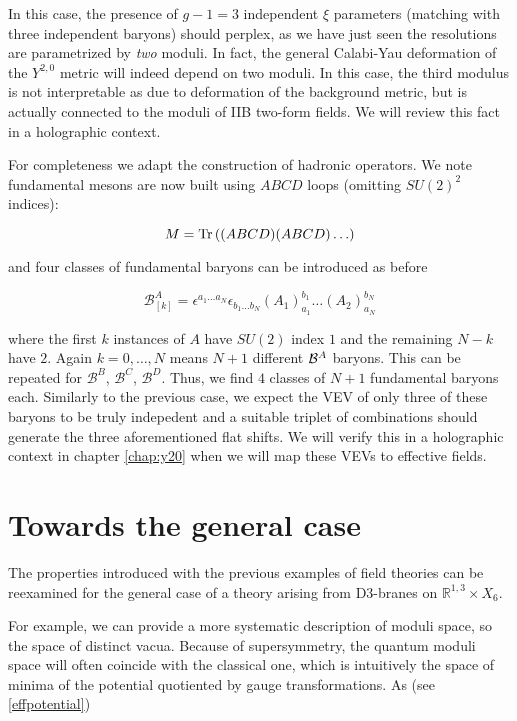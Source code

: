 In this case, the presence of $g-1 = 3$ independent $\xi$ parameters (matching with three independent baryons) should perplex, as we have just seen the resolutions are parametrized by \emph{two} moduli. In fact, the general Calabi-Yau deformation of the $Y^{2,0}$ metric will indeed depend on two moduli. In this case, the third modulus is not interpretable as due to deformation of the background metric, but is actually connected to the moduli of IIB two-form fields. We will review this fact in a holographic context.

For completeness we adapt the construction of hadronic operators. We note fundamental mesons are now built using $ABCD$ loops (omitting $SU(2)^2$ indices):

\begin{equation}
	M = \operatorname{Tr} \left( (ABCD)(ABCD) \ldots \right)
	\label{}
\end{equation}

and four classes of fundamental baryons can be introduced as before

\begin{equation}
	\mathcal{B}_{[k]}^A = \epsilon^{a_1\ldots a_N}\epsilon_{b_1 \ldots b_N} (A_1)^{b_1}_{a_1} \ldots (A_2)^{b_N}_{a_N}
	\label{}
\end{equation}

where the first $k$ instances of $A$ have $SU(2)$ index $1$ and the remaining $N - k$ have $2$. Again $k = 0, \ldots, N$ means $N+1$ different $\mathcal{B}^A$ baryons. This can be repeated for $\mathcal{B}^B$, $\mathcal{B}^C$, $\mathcal{B}^D$. Thus, we find $4$ classes of $N+1$ fundamental baryons each. Similarly to the previous case, we expect the VEV of only three of these baryons to be truly indepedent and a suitable triplet of combinations should generate the three aforementioned flat shifts. We will verify this in a holographic context in chapter \ref{chap:y20} when we will map these VEVs to effective fields.

\section{Towards the general case}\label{sec:conesgeneral}

The properties introduced with the previous examples of field theories can be reexamined for the general case of a theory arising from D3-branes on $\mathbb{R}^{1,3} \times X_6$.

For example, we can provide a more systematic description of moduli space, so the space of distinct vacua. Because of supersymmetry, the quantum moduli space will often coincide with the classical one, which is intuitively the space of minima of the potential quotiented by gauge transformations. As (see \eqref{effpotential})

